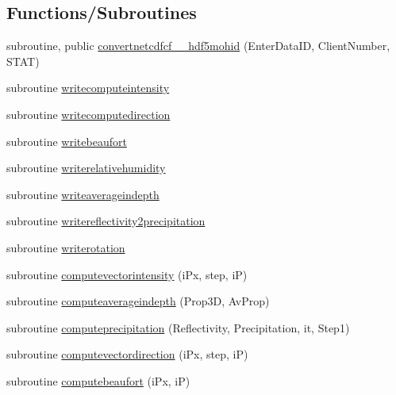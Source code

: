 \subsection*{Functions/\+Subroutines}
\begin{DoxyCompactItemize}
\item 
subroutine, public \mbox{\hyperlink{namespacemodulenetcdfcf__2__hdf5mohid_ad44cbe3d10b2660f418505ecaee704cc}{convertnetcdfcf\+\_\+\_\+hdf5mohid}} (Enter\+Data\+ID, Client\+Number, S\+T\+AT)
\item 
subroutine \mbox{\hyperlink{namespacemodulenetcdfcf__2__hdf5mohid_a01bd6ffe3872c8015fc8cc1d24e90de8}{writecomputeintensity}}
\item 
subroutine \mbox{\hyperlink{namespacemodulenetcdfcf__2__hdf5mohid_ae8ddd77f8739702fc89a6ced3c6794bc}{writecomputedirection}}
\item 
subroutine \mbox{\hyperlink{namespacemodulenetcdfcf__2__hdf5mohid_ae5e557cc9dcf221c2e0d2768df186417}{writebeaufort}}
\item 
subroutine \mbox{\hyperlink{namespacemodulenetcdfcf__2__hdf5mohid_a2137023763cf82253ee1d5e868541499}{writerelativehumidity}}
\item 
subroutine \mbox{\hyperlink{namespacemodulenetcdfcf__2__hdf5mohid_a31008b878c995f8aa06a2f70557abc17}{writeaverageindepth}}
\item 
subroutine \mbox{\hyperlink{namespacemodulenetcdfcf__2__hdf5mohid_a349ec5caaf89753f5f078da13ba6a247}{writereflectivity2precipitation}}
\item 
subroutine \mbox{\hyperlink{namespacemodulenetcdfcf__2__hdf5mohid_a92d3ed75b91b1a0e6d04680c3dfdbad0}{writerotation}}
\item 
subroutine \mbox{\hyperlink{namespacemodulenetcdfcf__2__hdf5mohid_a554c4456ac5359021e717df4e2d16fdf}{computevectorintensity}} (i\+Px, step, iP)
\item 
subroutine \mbox{\hyperlink{namespacemodulenetcdfcf__2__hdf5mohid_ad68e046fa00afcf9001262e40ce56492}{computeaverageindepth}} (Prop3D, Av\+Prop)
\item 
subroutine \mbox{\hyperlink{namespacemodulenetcdfcf__2__hdf5mohid_acd498610133c943ab2fe7e2cfc7c69e1}{computeprecipitation}} (Reflectivity, Precipitation, it, Step1)
\item 
subroutine \mbox{\hyperlink{namespacemodulenetcdfcf__2__hdf5mohid_a035fed19e9c4075ee7babb392fe071e6}{computevectordirection}} (i\+Px, step, iP)
\item 
subroutine \mbox{\hyperlink{namespacemodulenetcdfcf__2__hdf5mohid_a342a5907548f35cf4975a0ffd50c9a3c}{computebeaufort}} (i\+Px, iP)

\end{DoxyCompactItemize}
